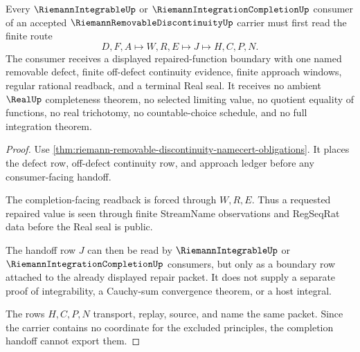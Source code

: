 \begin{theorem}
\label{thm:riemann-removable-discontinuity-completion-handoff}
Every $\RiemannIntegrableUp$ or $\RiemannIntegrationCompletionUp$ consumer of an accepted $\RiemannRemovableDiscontinuityUp$ carrier must first read the finite route
$$
D,F,A \longmapsto W,R,E \longmapsto J \longmapsto H,C,P,N.
$$
The consumer receives a displayed repaired-function boundary with one named removable defect, finite off-defect continuity evidence, finite approach windows, regular rational readback, and a terminal Real seal. It receives no ambient $\RealUp$ completeness theorem, no selected limiting value, no quotient equality of functions, no real trichotomy, no countable-choice schedule, and no full integration theorem.
\end{theorem}
\begin{proof}
Use \autoref{thm:riemann-removable-discontinuity-namecert-obligations}. It places the defect row, off-defect continuity row, and approach ledger before any consumer-facing handoff.

The completion-facing readback is forced through $W,R,E$. Thus a requested repaired value is seen through finite StreamName observations and RegSeqRat data before the Real seal is public.

The handoff row $J$ can then be read by $\RiemannIntegrableUp$ or $\RiemannIntegrationCompletionUp$ consumers, but only as a boundary row attached to the already displayed repair packet. It does not supply a separate proof of integrability, a Cauchy-sum convergence theorem, or a host integral.

The rows $H,C,P,N$ transport, replay, source, and name the same packet. Since the carrier contains no coordinate for the excluded principles, the completion handoff cannot export them.
\end{proof}



